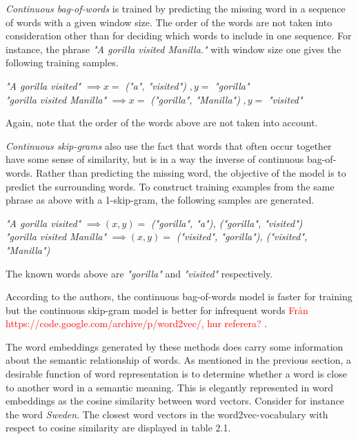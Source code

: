 \textit{Continuous bag-of-words} is trained by predicting the missing word in a sequence of words with a given window size. The order of the words are not taken into consideration other than for deciding which words to include in one sequence. For instance, the phrase \textit{"A gorilla visited Manilla."} with window size one gives the following training samples.
\begin{center}
\textit{"A gorilla visited"} $\implies x = $ \textit{("a", "visited")} $,y = $ \textit{"gorilla"} \\ \vspace{1em}
\textit{"gorilla visited Manilla"} $\implies x = $ \textit{("gorilla", "Manilla")} $,y = $ \textit{"visited"} \\
\end{center}

Again, note that the order of the words above are not taken into account. 


\textit{Continuous skip-grams} also use the fact that words that often occur together have some sense of similarity, but is in a way the inverse of continuous bag-of-words. Rather than predicting the missing word, the objective of the model is to predict the surrounding words. To construct training examples from the same phrase as above with a 1-skip-gram, the following samples are generated. 

\begin{center}
\textit{"A gorilla visited"} $\implies (x,y) = $ \textit{("gorilla", "a"), ("gorilla", "visited")} \\ \vspace{1em}
\textit{"gorilla visited Manilla"} $\implies (x,y) = $ \textit{("visited", "gorilla"), ("visited", "Manilla")}
\end{center}

The known words above are \textit{"gorilla"} and \textit{"visited"} respectively. 

According to the authors, the continuous bag-of-words model is faster for training but the continuous skip-gram model is better for infrequent words \textcolor{red}{Från  https://code.google.com/archive/p/word2vec/, hur referera? }. 


The word embeddings generated by these methods does carry some information about the semantic relationship of words. As mentioned in the previous section, a desirable function of word representation is to determine whether a word is close to another word in a semantic meaning. This is elegantly represented in word embeddings as the cosine similarity between word vectors. Consider for instance the word \textit{Sweden}. The closest word vectors in the word2vec-vocabulary with respect to cosine similarity are displayed in table 2.1. 

